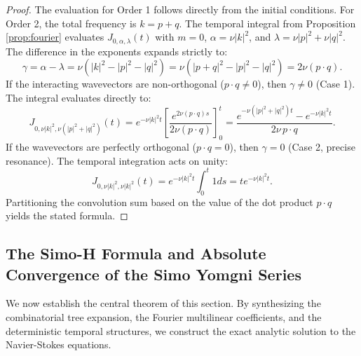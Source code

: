 \documentclass[12pt,a4paper]{article}
\theoremstyle{plain}
\theoremstyle{definition}
\theoremstyle{remark}
\begin{document}
\begin{proof}
The evaluation for Order 1 follows directly from the initial conditions. For Order 2, the total frequency is $k = p+q$. The temporal integral from Proposition \ref{prop:fourier} evaluates $J_{0, \alpha, \lambda}(t)$ with $m=0$, $\alpha = \nu|k|^2$, and $\lambda = \nu|p|^2 + \nu|q|^2$. 
The difference in the exponents expands strictly to:
\[
  \gamma = \alpha - \lambda = \nu(|k|^2 - |p|^2 - |q|^2) = \nu(|p+q|^2 - |p|^2 - |q|^2) = 2\nu(p \cdot q).
\]
If the interacting wavevectors are non-orthogonal ($p \cdot q \neq 0$), then $\gamma \neq 0$ (Case 1). The integral evaluates directly to:
\[
  J_{0, \nu|k|^2, \nu(|p|^2+|q|^2)}(t) = e^{-\nu|k|^2 t} \left[ \frac{e^{2\nu(p\cdot q)s}}{2\nu(p\cdot q)} \right]_0^t = \frac{e^{-\nu(|p|^2+|q|^2)t}-e^{-\nu|k|^2 t}}{2\nu\,p\cdot q}.
\]
If the wavevectors are perfectly orthogonal ($p \cdot q = 0$), then $\gamma = 0$ (Case 2, precise resonance). The temporal integration acts on unity:
\[
  J_{0, \nu|k|^2, \nu|k|^2}(t) = e^{-\nu|k|^2 t} \int_0^t 1 ds = t e^{-\nu|k|^2 t}.
\]
Partitioning the convolution sum based on the value of the dot product $p \cdot q$ yields the stated formula.
\end{proof}



\subsection{The Simo-H Formula and Absolute Convergence of the Simo Yomgni Series}
\label{subsec:main_theorem}

We now establish the central theorem of this section. By synthesizing the combinatorial tree expansion, the Fourier multilinear coefficients, and the deterministic temporal structures, we construct the exact analytic solution to the Navier-Stokes equations. 
\end{document}
